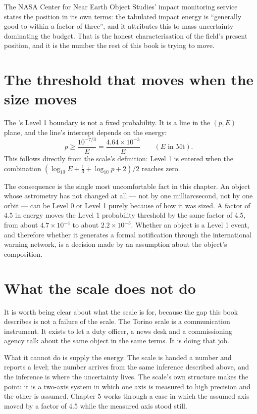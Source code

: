 The NASA Center for Near Earth Object Studies' impact monitoring service
states the position in its own terms: the tabulated impact energy is
``generally good to within a factor of three'', and it attributes this to mass
uncertainty dominating the budget. That is the honest characterisation of the
field's present position, and it is the number the rest of this book is trying
to move.

\section{The threshold that moves when the size moves}

The 's Level 1 boundary is not a fixed probability. It is a line
in the \((p, E)\) plane, and the line's intercept depends on the energy:
\begin{equation}
p \geq \frac{10^{-7/3}}{E} = \frac{4.64\times 10^{-3}}{E}\qquad (E \text{ in Mt}).
\label{eq:level1}
\end{equation}
This follows directly from the scale's definition: Level 1 is entered when
the combination \((\log_{10} E + \tfrac{1}{3} + \log_{10} p + 2)/2\) reaches
zero.

The consequence is the single most uncomfortable fact in this chapter. An
object whose astrometry has not changed at all --- not by one milliarcsecond,
not by one orbit --- can be Level 0 or Level 1 purely because of how it was
sized. A factor of 4.5 in energy moves the Level 1 probability threshold by
the same factor of 4.5, from about \(4.7\times 10^{-4}\) to about
\(2.2\times 10^{-3}\). Whether an object is a Level 1 event, and therefore
whether it generates a formal notification through the international warning
network, is a decision made by an assumption about the object's composition.

\section{What the scale does not do}

It is worth being clear about what the scale is for, because the gap this
book describes is not a failure of the scale. The Torino scale is a
communication instrument. It exists to let a duty officer, a news desk and a
commissioning agency talk about the same object in the same terms. It is
doing that job.

What it cannot do is supply the energy. The scale is handed a number and
reports a level; the number arrives from the same inference described above,
and the inference is where the uncertainty lives. The scale's own structure
makes the point: it is a two-axis system in which one axis is measured to
high precision and the other is assumed. Chapter 5 works through a case in
which the assumed axis moved by a factor of 4.5 while the measured axis stood
still.

